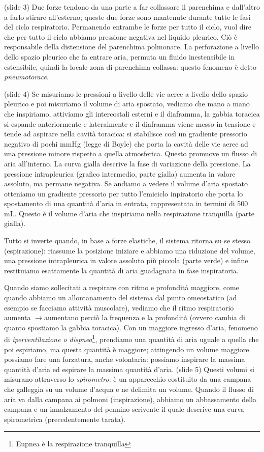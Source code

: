 \documentclass[a4paper,12pt]{article}
\newcommand{\lfreccia}{\ensuremath{\longrightarrow}}
\begin{document}
 (slide 3) Due forze tendono da una parte a far collassare il parenchima e dall'altro a farlo stirare all'esterno; queste due forze sono mantenute durante tutte le fasi del ciclo respiratorio. Permanendo entrambe le forze per tutto il ciclo, vuol dire che per tutto il ciclo abbiamo pressione negativa nel liquido pleurico. Ciò è responsabile della distensione del parenchima polmonare. La perforazione a livello dello spazio pleurico che fa entrare aria, permuta un fluido inestensibile in estensibile, quindi la locale zona di parenchima collassa: questo fenomeno è detto \emph{pneumotorace}.

(slide 4) Se misuriamo le pressioni a livello delle vie aeree a livello dello spazio pleurico e poi misuriamo il volume di aria spostato, vediamo che mano a mano che inspiriamo, attiviamo gli intercostali esterni e il diaframma, la gabbia toracica si espande anteriormente e lateralmente e il diaframma viene messo in tensione e tende ad aspirare nella cavità toracica: si stabilisce così un gradiente pressorio negativo di pochi mmHg (legge di Boyle) che porta la cavità delle vie aeree ad una pressione minore rispetto a quella atmosferica. Questo promuove un flusso di aria all'interno. La curva gialla descrive la fase di variazione della pressione. La pressione intrapleurica (grafico intermedio, parte gialla) aumenta in valore assoluto, ma permane negativa. Se andiamo a vedere il volume d'aria spostato otteniamo un gradiente pressorio per tutto l'emiciclo inpiratorio che porta lo spostamento di una quantità d'aria in entrata, rappresentata in termini di 500 mL. Questo è il volume d'aria che inspiriamo nella respirazione tranquilla (parte gialla).

Tutto si inverte quando, in base a forze elastiche, il sistema ritorna su se stesso (espirazione): riassume la posizione iniziare e abbiamo una riduzione del volume, una pressione intrapleurica in valore assoluto più piccola (parte verde) e infine restituiamo esattamente la quantità di aria guadagnata in fase inspiratoria.
 
Quando siamo sollecitati a respirare con ritmo e profondità maggiore, come quando abbiamo un allontanamento del sistema dal punto omeostatico (ad esempio se facciamo attività muscolare), vediamo che il ritmo respiratorio aumenta \lfreccia aumentano perciò la frequenza e la profondità (ovvero cambia di quanto spostiamo la gabbia toracica). Con un maggiore ingresso d'aria, fenomeno di \emph{iperventilazione o dispnea}\footnote{Eupnea è la respirazione tranquilla}, prendiamo una quantità di aria uguale a quella che poi espiriamo, ma questa quantità è maggiore; attingendo un volume maggiore possiamo fare una forzatura, anche volontaria: possiamo inspirare la massima quantità d'aria ed espirare la massima quantità d'aria. (slide 5) Questi volumi si misurano attraverso lo \emph{spirometro}: è un apparecchio costituito da una campana che galleggia su un volume d'acqua e ne delimita un volume. Quando il flusso di aria va dalla campana ai polmoni (inspirazione), abbiamo un abbassamento della campana e un innalzamento del pennino scrivente il quale descrive una curva spirometrica (precedentemente tarata). 
\end{document}
